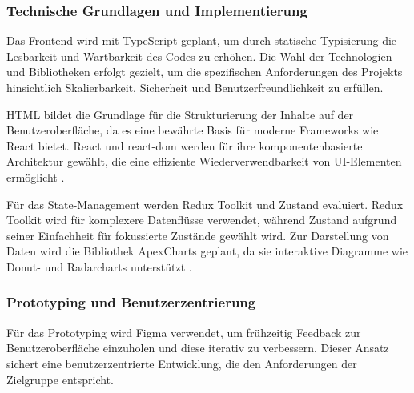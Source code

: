 \subsubsection*{Technische Grundlagen und Implementierung}
Das Frontend wird mit TypeScript geplant, um durch statische Typisierung die Lesbarkeit und Wartbarkeit des Codes zu erhöhen. Die Wahl der Technologien und Bibliotheken erfolgt gezielt, um die spezifischen Anforderungen des Projekts hinsichtlich Skalierbarkeit, Sicherheit und Benutzerfreundlichkeit zu erfüllen.

HTML bildet die Grundlage für die Strukturierung der Inhalte auf der Benutzeroberfläche, da es eine bewährte Basis für moderne Frameworks wie React bietet. React und react-dom werden für ihre komponentenbasierte Architektur gewählt, die eine effiziente Wiederverwendbarkeit von UI-Elementen ermöglicht \cite{facebook2021react}. 

Für das State-Management werden Redux Toolkit und Zustand evaluiert. Redux Toolkit wird für komplexere Datenflüsse verwendet, während Zustand aufgrund seiner Einfachheit für fokussierte Zustände gewählt wird. Zur Darstellung von Daten wird die Bibliothek ApexCharts geplant, da sie interaktive Diagramme wie Donut- und Radarcharts unterstützt \cite{apexchartsDoc}. 

\subsubsection*{Prototyping und Benutzerzentrierung} 
Für das Prototyping wird Figma verwendet, um frühzeitig Feedback zur Benutzeroberfläche einzuholen und diese iterativ zu verbessern. Dieser Ansatz sichert eine benutzerzentrierte Entwicklung, die den Anforderungen der Zielgruppe entspricht.

